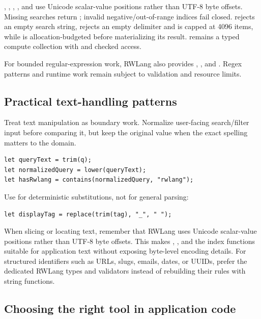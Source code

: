 , , , , and  use Unicode scalar-value positions rather than UTF-8 byte offsets. Missing searches return ; invalid negative/out-of-range indices fail closed.  rejects an empty search string,  rejects an empty delimiter and is capped at 4096 items, while  is allocation-budgeted before materializing its result.  remains a typed compute collection with  and checked  access.

For bounded regular-expression work, RWLang also provides , , and . Regex patterns and runtime work remain subject to validation and resource limits.

\subsection*{Practical text-handling patterns}

Treat text manipulation as boundary work. Normalize user-facing search/filter input before comparing it, but keep the original value when the exact spelling matters to the domain.

\begin{lstlisting}[language=RWLang]
let queryText = trim(q);
let normalizedQuery = lower(queryText);
let hasRwlang = contains(normalizedQuery, "rwlang");
\end{lstlisting}

Use  for deterministic substitutions, not for general parsing:

\begin{lstlisting}[language=RWLang]
let displayTag = replace(trim(tag), "_", " ");
\end{lstlisting}

When slicing or locating text, remember that RWLang uses Unicode scalar-value positions rather than UTF-8 byte offsets. This makes , , and the index functions suitable for application text without exposing byte-level encoding details. For structured identifiers such as URLs, slugs, emails, dates, or UUIDs, prefer the dedicated RWLang types and validators instead of rebuilding their rules with string functions.

\subsection*{Choosing the right tool in application code}

